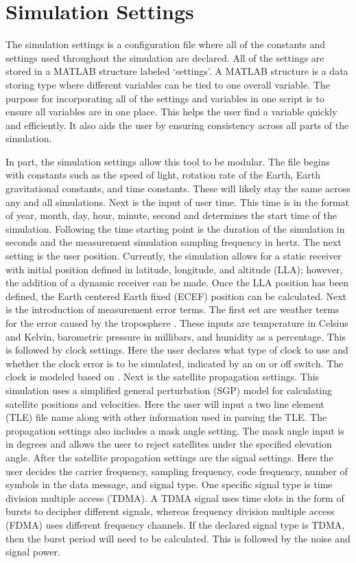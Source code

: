 \documentclass[12pt]{report}
\begin{document}
\section{Simulation Settings}

The simulation settings is a configuration file where all of the constants and settings used throughout the simulation are declared. All of the settings are stored in a MATLAB structure labeled `settings'. A MATLAB structure is a data storing type where different variables can be tied to one overall variable. The purpose for incorporating all of the settings and variables in one script is to ensure all variables are in one place. This helps the user find a variable quickly and efficiently. It also aids the user by ensuring consistency across all parts of the simulation. 

In part, the simulation settings allow this tool to be modular. The file begins with constants such as the speed of light, rotation rate of the Earth, Earth gravitational constants, and time constants. These will likely stay the same across any and all simulations. Next is the input of user time. This time is in the format of year, month, day, hour, minute, second and determines the start time of the simulation. Following the time starting point is the duration of the simulation in seconds and the measurement simulation sampling frequency in hertz. The next setting is the user position. Currently, the simulation allows for a static receiver with initial position defined in latitude, longitude, and altitude (LLA); however, the addition of a dynamic receiver can be made. Once the LLA position has been defined, the Earth centered Earth fixed (ECEF) position can be calculated. Next is the introduction of measurement error terms. The first set are weather terms for the error caused by the troposphere \cite{misraGlobalPositioningSystem2012}. These inputs are temperature in Celsius and Kelvin, barometric pressure in millibars, and humidity as a percentage. This is followed by clock settings. Here the user declares what type of clock to use and whether the clock error is to be simulated, indicated by an on or off switch. The clock is modeled based on \cite{}. Next is the satellite propagation settings. This simulation uses a simplified general perturbation (SGP) model for calculating satellite positions and velocities. Here the user will input a two line element (TLE) file name along with other information used in parsing the TLE. The propagation settings also includes a mask angle setting. The mask angle input is in degrees and allows the user to reject  satellites under the specified elevation angle. After the satellite propagation settings are the signal settings. Here the user decides the carrier frequency, sampling frequency, code frequency, number of symbols in the data message, and signal type. One specific signal type is time division multiple access (TDMA). A TDMA signal uses time slots in the form of bursts to decipher different signals, whereas frequency division multiple access (FDMA) uses different frequency channels. If the declared signal type is TDMA, then the burst period will need to be calculated. This is followed by the noise and signal power.
\end{document}
